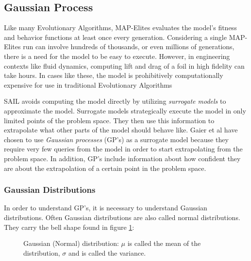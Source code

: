 \documentclass{sig-alternate}
\begin{document}
\begin{figure*}[!t]
\centering
{}
\caption{Pseudocode of default MAP-Elites. Taken from \cite{Mouret:2015}.}
\label{fig:MAP-ElitesPCode}
\end{figure*}

\label{MAPElitesSub}

\subsection{Gaussian Process}
\label{gaussianProcess}

Like many Evolutionary Algorithms, MAP-Elites evaluates the model's fitness and behavior functions at least once every generation.
Considering a single MAP-Elites run can involve hundreds of thousands, or even millions of generations, there is a need for the model to be easy to execute.
However, in engineering contexts like fluid dynamics, computing lift and drag of a foil in high fidelity can take hours.
In cases like these, the model is prohibitively computationally expensive for use in traditional Evolutionary Algorithms

SAIL avoids computing the model directly by utilizing \textit{surrogate models} to approximate the model.
Surrogate models strategically execute the model in only limited points of the problem space. 
They then use this information to extrapolate what other parts of the model should behave like.
Gaier et al have chosen to use \textit{Gaussian processes} (GP's) as a surrogate model because they require very few queries from the model in order to start extrapolating from the problem space.
In addition, GP's include information about how confident they are about the extrapolation of a certain point in the problem space.

\subsubsection{Gaussian Distributions}
\label{GaussianDistributions}

In order to understand GP's, it is necessary to understand Gaussian distributions.
Often Gaussian distributions are also called normal distributions.
They carry the bell shape found in figure \ref{fig:UnivariateGaussian}:

\begin{figure}[htb]
\centering
{}
\caption{Gaussian (Normal) distribution: $\mu$ is called the mean of the distribution, $\sigma$ and is called the variance.}
\label{fig:UnivariateGaussian}
\end{figure}
\end{document}
